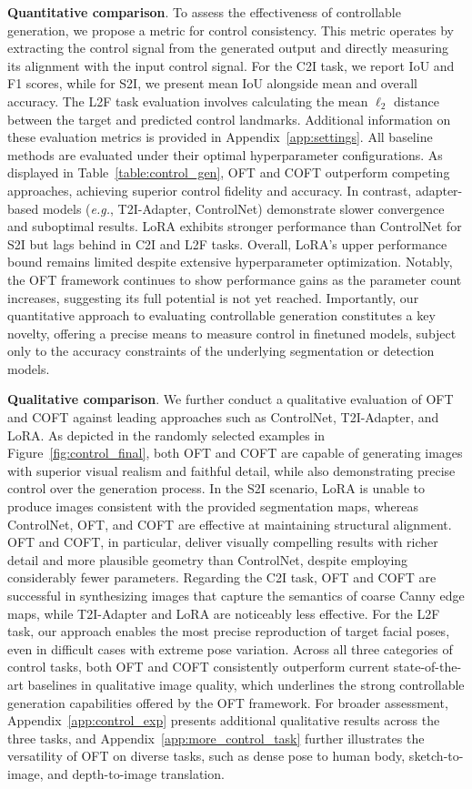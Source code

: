 \textbf{Quantitative comparison}. To assess the effectiveness of controllable generation, we propose a metric for control consistency. This metric operates by extracting the control signal from the generated output and directly measuring its alignment with the input control signal. For the C2I task, we report IoU and F1 scores, while for S2I, we present mean IoU alongside mean and overall accuracy. The L2F task evaluation involves calculating the mean $\ell_2$ distance between the target and predicted control landmarks. Additional information on these evaluation metrics is provided in Appendix~\ref{app:settings}. All baseline methods are evaluated under their optimal hyperparameter configurations. As displayed in Table~\ref{table:control_gen}, OFT and COFT outperform competing approaches, achieving superior control fidelity and accuracy. In contrast, adapter-based models (\emph{e.g.}, T2I-Adapter, ControlNet) demonstrate slower convergence and suboptimal results. LoRA exhibits stronger performance than ControlNet for S2I but lags behind in C2I and L2F tasks. Overall, LoRA's upper performance bound remains limited despite extensive hyperparameter optimization. Notably, the OFT framework continues to show performance gains as the parameter count increases, suggesting its full potential is not yet reached. Importantly, our quantitative approach to evaluating controllable generation constitutes a key novelty, offering a precise means to measure control in finetuned models, subject only to the accuracy constraints of the underlying segmentation or detection models.

\textbf{Qualitative comparison}. We further conduct a qualitative evaluation of OFT and COFT against leading approaches such as ControlNet, T2I-Adapter, and LoRA. As depicted in the randomly selected examples in Figure~\ref{fig:control_final}, both OFT and COFT are capable of generating images with superior visual realism and faithful detail, while also demonstrating precise control over the generation process. In the S2I scenario, LoRA is unable to produce images consistent with the provided segmentation maps, whereas ControlNet, OFT, and COFT are effective at maintaining structural alignment. OFT and COFT, in particular, deliver visually compelling results with richer detail and more plausible geometry than ControlNet, despite employing considerably fewer parameters. Regarding the C2I task, OFT and COFT are successful in synthesizing images that capture the semantics of coarse Canny edge maps, while T2I-Adapter and LoRA are noticeably less effective. For the L2F task, our approach enables the most precise reproduction of target facial poses, even in difficult cases with extreme pose variation. Across all three categories of control tasks, both OFT and COFT consistently outperform current state-of-the-art baselines in qualitative image quality, which underlines the strong controllable generation capabilities offered by the OFT framework. For broader assessment, Appendix~\ref{app:control_exp} presents additional qualitative results across the three tasks, and Appendix~\ref{app:more_control_task} further illustrates the versatility of OFT on diverse tasks, such as dense pose to human body, sketch-to-image, and depth-to-image translation.


